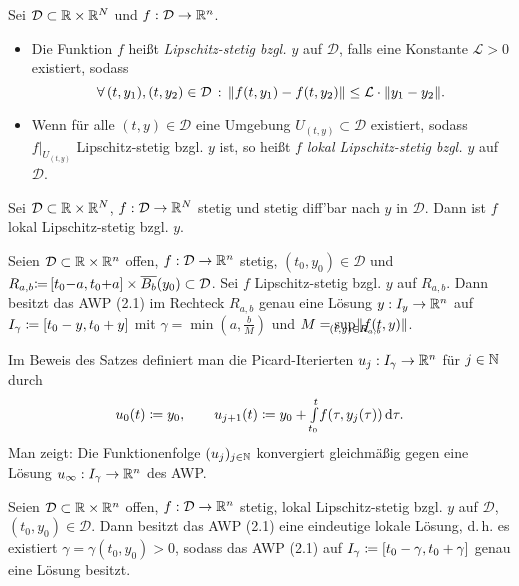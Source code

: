 \documentclass{cheat-sheet}
\newcommand{\D}{\mathcal{D}}
\begin{document}

\begin{defn}
  Sei $\D \subset \R \times \R^N$ und $f : \D \to \R^n$.
  \begin{itemize}
    \item Die Funktion $f $ heißt \emph{Lipschitz-stetig bzgl. $y$} auf $\D$, falls eine Konstante $\mathcal{L} > 0$ existiert, sodass
    \[ \fa{(t, y_1), (t, y_2) \in \D} \norm{f(t, y_1) - f(t, y_2)} \leq \mathcal{L} \cdot \norm{y_1 - y_2}. \]
    \item Wenn für alle $(t, y) \in \D$ eine Umgebung $U_{(t, y)} \subset \D$ existiert, sodass $f|_{U_{(t,y)}}$ Lipschitz-stetig bzgl. $y$ ist, so heißt $f$ \emph{lokal Lipschitz-stetig bzgl. $y$} auf $\D$.
  \end{itemize}
\end{defn}

\begin{lem}
  Sei $\D \subset \R \times \R^N$, $f : \D \to \R^N$ stetig und stetig diff'bar nach $y$ in $\D$. Dann ist $f$ lokal Lipschitz-stetig bzgl. $y$.
\end{lem}


\begin{satz}
  Seien $\D \subset \R \times \R^n$ offen, $f : \D \to \R^n$ stetig, $(t_0, y_0) {\in} \D$ und $R_{a,b} {\coloneqq} \cinterval{ t_0 {-} a }{ t_0 {+} a } \times \overline{B_b}(y_0) \subset \D$. Sei $f$ Lipschitz-stetig bzgl. $y$ auf $R_{a,b}$. Dann besitzt das AWP (2.1) im Rechteck $R_{a,b}$ genau eine Lösung $y : I_y \to \mathbb{R}^n$ auf $I_{\gamma} \coloneqq \left[ t_0 - y, t_0 + y \right]$ mit $\gamma = \min(a, \tfrac{b}{M})$ und $M = \sup_{\mathclap{(t,y) \in R_{a,b}}} \norm{f(t, y)}$.
\end{satz}

\begin{bem}
  Im Beweis des Satzes definiert man die Picard-Iterierten $u_j : I_\gamma \to \mathbb{R}^n$ für $j \in \mathbb{N}$ durch
  \[
    u_0(t) \coloneqq y_0, \qquad
    u_{j+1}(t) \coloneqq y_0 + {\textstyle \int\limits_{t_0}^{t}} f(\tau, y_j(\tau)) \,\mathrm{d} \tau.
  \]
  Man zeigt: Die Funktionenfolge $(u_j)_{j \in \mathbb{N}}$ konvergiert gleichmäßig gegen eine Lösung $u_\infty : I_\gamma \to \mathbb{R}^n$ des AWP.
\end{bem}


\begin{satz}
  Seien $\D \subset \R \times \R^n$ offen, $f : \D \to \R^n$ stetig, lokal Lipschitz-stetig bzgl. $y$ auf $\D$, $(t_0, y_0) \in \D$. Dann besitzt das AWP (2.1) eine eindeutige lokale Lösung, d.\,h. es existiert $\gamma = \gamma(t_0, y_0) > 0$, sodass das AWP (2.1) auf $I_\gamma \coloneqq \left[ t_0 - \gamma, t_0 + \gamma \right]$ genau eine Lösung besitzt.
\end{satz}
\end{document}
